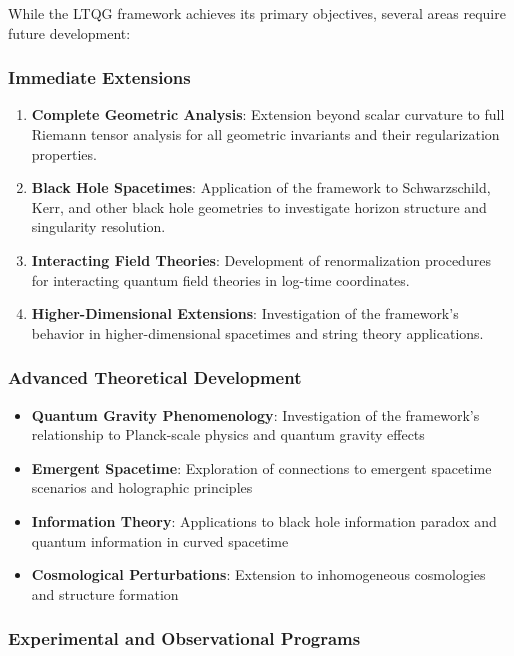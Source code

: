 While the LTQG framework achieves its primary objectives, several areas require future development:

\subsubsection{Immediate Extensions}

\begin{enumerate}
\item \textbf{Complete Geometric Analysis}: Extension beyond scalar curvature to full Riemann tensor analysis for all geometric invariants and their regularization properties.

\item \textbf{Black Hole Spacetimes}: Application of the framework to Schwarzschild, Kerr, and other black hole geometries to investigate horizon structure and singularity resolution.

\item \textbf{Interacting Field Theories}: Development of renormalization procedures for interacting quantum field theories in log-time coordinates.

\item \textbf{Higher-Dimensional Extensions}: Investigation of the framework's behavior in higher-dimensional spacetimes and string theory applications.
\end{enumerate}

\subsubsection{Advanced Theoretical Development}

\begin{itemize}
\item \textbf{Quantum Gravity Phenomenology}: Investigation of the framework's relationship to Planck-scale physics and quantum gravity effects
\item \textbf{Emergent Spacetime}: Exploration of connections to emergent spacetime scenarios and holographic principles
\item \textbf{Information Theory}: Applications to black hole information paradox and quantum information in curved spacetime
\item \textbf{Cosmological Perturbations}: Extension to inhomogeneous cosmologies and structure formation
\end{itemize}

\subsubsection{Experimental and Observational Programs}


